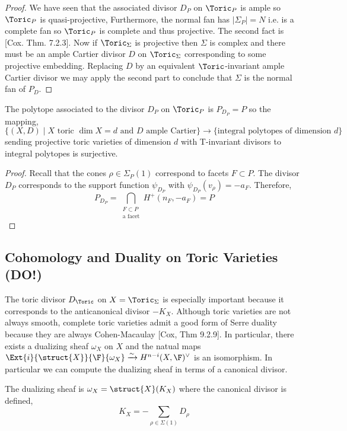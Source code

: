 \documentclass[12pt]{article}
\begin{document}
\begin{proof}
We have seen that the associated divisor $D_P$ on $\Toric_P$ is ample so $\Toric_P$ is quasi-projective, Furthermore, the normal fan has $|\Sigma_P| = N$ i.e. is a complete fan so $\Toric_P$ is complete and thus projective. The second fact is [Cox. Thm. 7.2.3]. Now if $\Toric_\Sigma$ is projective then $\Sigma$ is complex and there must be an ample Cartier divisor $D$ on $\Toric_\Sigma$ corresponding to some projective embedding. Replacing $D$ by an equivalent $\Toric$-invariant ample Cartier divisor we may apply the second part to conclude that $\Sigma$ is the normal fan of $P_D$. 
\end{proof}

\begin{theorem}
The polytope associated to the divisor $D_P$ on $\Toric_P$ is $P_{D_P} = P$ so the mapping,
\[ \{ (X, D) \mid X \text{ toric } \dim{X} = d \text{ and  } D \text{ ample Cartier} \} \to \{ \text{integral polytopes of dimension } d \} \]
sending projective toric varieties of dimension $d$ with T-invariant divisors to integral polytopes is surjective. 
\end{theorem}

\begin{proof}
Recall that the cones $\rho \in \Sigma_P(1)$ correspond to facets $F \subset P$. 
The divisor $D_P$ corresponds to the support function $\psi_{D_P}$ with $\psi_{D_P}(v_\rho) = - a_F$. Therefore,
\[ P_{D_P} = \bigcap_{\substack{F \subset P \\ \text{a facet}}} H^+(n_F, - a_F) = P \]
\end{proof}

\subsection{Cohomology and Duality on Toric Varieties (DO!)} 

The toric divisor $D_\Toric$ on $X = \Toric_\Sigma$ is especially important because it corresponds to the anticanonical divisor $-K_X$. Although toric varieties are not always smooth, complete toric varieties admit a good form of Serre duality because they are always Cohen-Macaulay [Cox, Thm 9.2.9]. In particular, there exists a dualizing sheaf $\omega_X$ on $X$ and the natual maps $\Ext{i}{\struct{X}}{\F}{\omega_X} \xrightarrow{\sim} H^{n-i}(X, \F)^\vee$ is an isomorphism. In particular we can compute the dualizing sheaf in terms of a canonical divisor.
\begin{lemma}
The dualizing sheaf is $\omega_X = \struct{X}(K_X)$ where the canonical divisor is defined,
\[ K_X =  - \sum_{\rho \in \Sigma(1)} D_\rho \]
\end{lemma}
\end{document}
